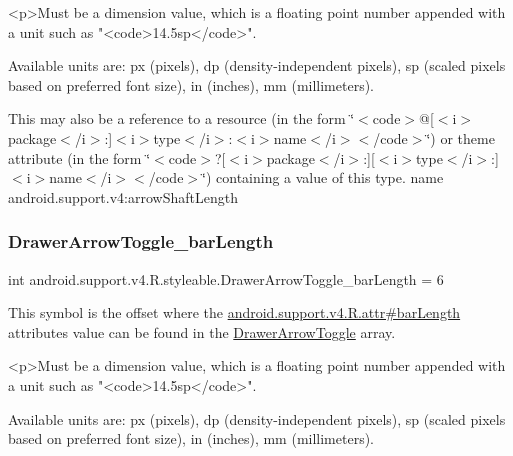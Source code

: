 \begin{DoxyVerb}      <p>Must be a dimension value, which is a floating point number appended with a unit such as "<code>14.5sp</code>".
\end{DoxyVerb}
 Available units are\+: px (pixels), dp (density-\/independent pixels), sp (scaled pixels based on preferred font size), in (inches), mm (millimeters). 

This may also be a reference to a resource (in the form \char`\"{}$<$code$>$@\mbox{[}$<$i$>$package$<$/i$>$\+:\mbox{]}$<$i$>$type$<$/i$>$\+:$<$i$>$name$<$/i$>$$<$/code$>$\char`\"{}) or theme attribute (in the form \char`\"{}$<$code$>$?\mbox{[}$<$i$>$package$<$/i$>$\+:\mbox{]}\mbox{[}$<$i$>$type$<$/i$>$\+:\mbox{]}$<$i$>$name$<$/i$>$$<$/code$>$\char`\"{}) containing a value of this type.  name android.\+support.\+v4\+:arrow\+Shaft\+Length \mbox{\label{classandroid_1_1support_1_1v4_1_1R_1_1styleable_a4f8d98b05b91ea2e7981c8af25395159}} 
\subsubsection{\texorpdfstring{Drawer\+Arrow\+Toggle\+\_\+bar\+Length}{DrawerArrowToggle\_barLength}}
{\footnotesize\ttfamily int android.\+support.\+v4.\+R.\+styleable.\+Drawer\+Arrow\+Toggle\+\_\+bar\+Length = 6\hspace{0.3cm}{\ttfamily [static]}}

This symbol is the offset where the \hyperlink{classandroid_1_1support_1_1v4_1_1R_1_1attr_ad58969d24cd9bf6a2af3fdd44ca43dbf}{android.\+support.\+v4.\+R.\+attr\#bar\+Length} attribute\textquotesingle{}s value can be found in the \hyperlink{classandroid_1_1support_1_1v4_1_1R_1_1styleable_af08d693b5d7faf0f18822ffe29c6028c}{Drawer\+Arrow\+Toggle} array.

\begin{DoxyVerb}      <p>Must be a dimension value, which is a floating point number appended with a unit such as "<code>14.5sp</code>".
\end{DoxyVerb}
 Available units are\+: px (pixels), dp (density-\/independent pixels), sp (scaled pixels based on preferred font size), in (inches), mm (millimeters). 

